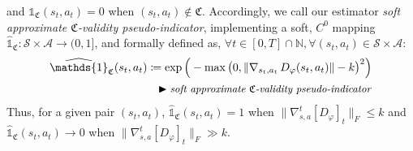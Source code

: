 and $\mathds{1}_\mathfrak{C}(s_t,a_t) = 0$ when $(s_t,a_t) \notin \mathfrak{C}$.
Accordingly, we call our estimator \textit{soft approximate $\mathfrak{C}$-validity pseudo-indicator},
implementing a soft, $C^0$ mapping $\widehat{\mathds{1}}_\mathfrak{C}: \mathcal{S} \times \mathcal{A} \to (0,1]$,
and formally defined as,
$\forall t \in [0, T] \cap \mathbb{N},
\forall (s_t, a_t) \in \mathcal{S} \times \mathcal{A}$:
\begin{align}
\widehat{\mathds{1}}_\mathfrak{C}(s_t,a_t) \coloneqq \exp \Big(-
\max \big(0, \lVert \nabla_{s_t,a_t} \, D_\varphi (s_t,a_t) \rVert - k\big)^2\Big)
\label{pseudoindicator}
\\
\blacktriangleright\text{\small{\textit{soft approximate $\mathfrak{C}$-validity pseudo-indicator}}} \nonumber
\end{align}
Thus, for a given pair $(s_t, a_t)$,
$\widehat{\mathds{1}}_\mathfrak{C}(s_t,a_t) = 1$
when $\lVert \nabla_{s,a}^t[D_\varphi]_t \rVert _F \leq k$
and $\widehat{\mathds{1}}_\mathfrak{C}(s_t,a_t) \to 0$
when $\lVert \nabla_{s,a}^t[D_\varphi]_t \rVert _F \gg k$.

